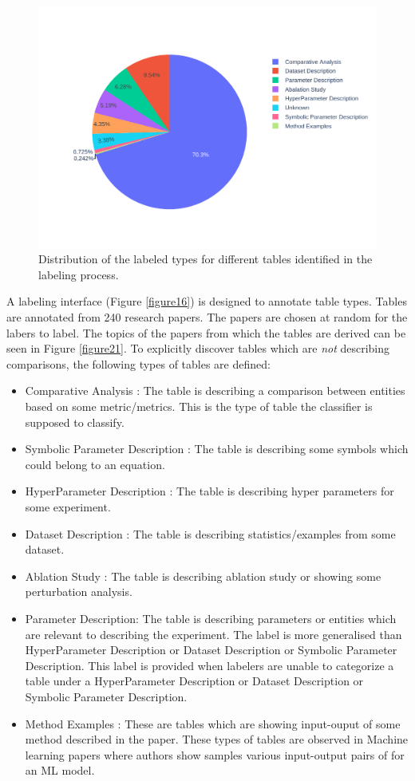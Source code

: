 \begin{figure}[h]
    \centering
    \includegraphics[width=\maxwidth{\textwidth}]{src/images/labeled_intent_distribution.pdf}
    \caption{Distribution of the labeled types for different tables identified in the labeling process.}
    \label{figure\arabic{figurecounter}}
\end{figure}
A labeling interface (Figure \ref{figure16}) is designed to annotate table types. Tables are annotated from 240 research papers. The papers are chosen at random for the labers to label. The topics of the papers from which the tables are derived can be seen in Figure \ref{figure21}. To explicitly discover tables which are \textit{not} describing comparisons, the following types of tables are defined: 
\begin{itemize}
    \item Comparative Analysis : The table is describing a comparison between entities based on some metric/metrics. This is the type of table the classifier is supposed to classify.
    \item Symbolic Parameter Description : The table is describing some symbols which could belong to an equation.
    \item HyperParameter Description : The table is describing hyper parameters for some experiment.
    \item Dataset Description : The table is describing statistics/examples from some dataset. 
    \item Ablation Study : The table is describing ablation study or showing some perturbation analysis.
    \item Parameter Description: The table is describing parameters or entities which are relevant to describing the experiment. The label is more generalised than HyperParameter Description or Dataset Description or Symbolic Parameter Description. This label is provided when labelers are unable to categorize a table under a HyperParameter Description or Dataset Description or Symbolic Parameter Description. 
    \item Method Examples : These are tables which are showing input-ouput of some method described in the paper. These types of tables are observed in Machine learning papers where authors show samples various input-output pairs of for an ML model.
\end{itemize}
